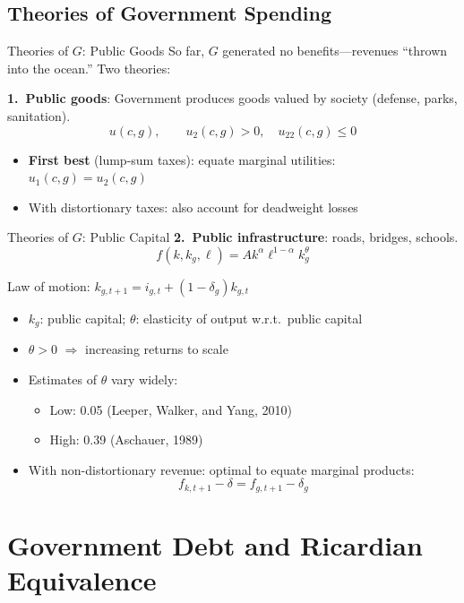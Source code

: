 \documentclass[blue]{beamer}
\begin{document}
\subsection{Theories of Government Spending}

\begin{frame}{Theories of $G$: Public Goods}
	So far, $G$ generated no benefits---revenues ``thrown into the ocean.'' Two theories:
	
	\bigskip
	\textbf{1.\ Public goods}: Government produces goods valued by society (defense, parks, sanitation).
	\[
	u(c, g), \qquad u_2(c,g) > 0, \quad u_{22}(c,g) \leq 0
	\]
	
	\begin{itemize}
		\item \textbf{First best} (lump-sum taxes): equate marginal utilities: $u_1(c,g) = u_2(c,g)$
		\item With distortionary taxes: also account for deadweight losses
	\end{itemize}
\end{frame}


\begin{frame}{Theories of $G$: Public Capital}
	\textbf{2.\ Public infrastructure}: roads, bridges, schools.
	\[
	f(k, k_g, \ell) = A k^\alpha \ell^{1-\alpha} k_g^\theta
	\]
	
	Law of motion: $k_{g,t+1} = i_{g,t} + (1-\delta_g) k_{g,t}$
	
	\begin{itemize}
		\item $k_g$: public capital; $\theta$: elasticity of output w.r.t.\ public capital
		\item $\theta > 0$ $\Rightarrow$ increasing returns to scale
		\item Estimates of $\theta$ vary widely:
		\begin{itemize}
			\item Low: 0.05 (Leeper, Walker, and Yang, 2010)
			\item High: 0.39 (Aschauer, 1989)
		\end{itemize}
		\item With non-distortionary revenue: optimal to equate marginal products:
		\[
		f_{k,t+1} - \delta = f_{g,t+1} - \delta_g
		\]
	\end{itemize}
\end{frame}

\section{Government Debt and Ricardian Equivalence}
\end{document}
